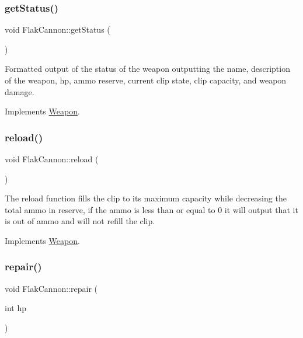 \subsubsection{\texorpdfstring{get\+Status()}{getStatus()}}
{\footnotesize\ttfamily void Flak\+Cannon\+::get\+Status (\begin{DoxyParamCaption}{ }\end{DoxyParamCaption})\hspace{0.3cm}{\ttfamily [virtual]}}

Formatted output of the status of the weapon outputting the name, description of the weapon, hp, ammo reserve, current clip state, clip capacity, and weapon damage. 

Implements \hyperlink{classWeapon}{Weapon}.

\mbox{\label{classFlakCannon_acfc4f5bc0a9c9a0b079c5a3a8fea67f3}} 
\subsubsection{\texorpdfstring{reload()}{reload()}}
{\footnotesize\ttfamily void Flak\+Cannon\+::reload (\begin{DoxyParamCaption}{ }\end{DoxyParamCaption})\hspace{0.3cm}{\ttfamily [virtual]}}

The reload function fills the clip to its maximum capacity while decreasing the total ammo in reserve, if the ammo is less than or equal to 0 it will output that it is out of ammo and will not refill the clip. 

Implements \hyperlink{classWeapon}{Weapon}.

\mbox{\label{classFlakCannon_a7874f80b4d83c9c2bfc69493d7285eeb}} 
\subsubsection{\texorpdfstring{repair()}{repair()}}
{\footnotesize\ttfamily void Flak\+Cannon\+::repair (\begin{DoxyParamCaption}\item[{int}]{hp }\end{DoxyParamCaption})\hspace{0.3cm}{\ttfamily [virtual]}}


